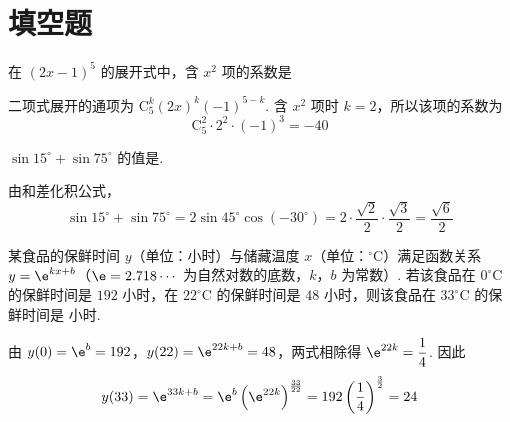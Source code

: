 \section{填空题}

\begin{problem}
在 \((2x - 1)^{5}\) 的展开式中，含 \(x^{2}\) 项的系数是\fillinblank{}


\begin{solution}
二项式展开的通项为 \(\mathrm C_5^k(2x)^k(-1)^{5-k}\). 含 \(x^2\) 项时 \(k=2\)，所以该项的系数为
\[
\mathrm C_5^2\cdot2^2\cdot(-1)^3=-40
\]
\end{solution}
\end{problem}

\begin{problem}
\(\sin 15^{\circ} + \sin 75^{\circ}\) 的值是\fillinblank{}.


\begin{solution}
由和差化积公式，
\[
\sin15^{\circ}+\sin75^{\circ}=2\sin45^{\circ}\cos\left(-30^{\circ}\right)=2\cdot\frac{\sqrt2}{2}\cdot\frac{\sqrt3}{2}=\frac{\sqrt6}{2}
\]
\end{solution}
\end{problem}

\begin{problem}
某食品的保鲜时间 \(y\)（单位：小时）与储藏温度 \(x\)（单位：\(^{\circ}\mathrm{C}\)）满足函数关系 \(y = \e^{kx + b}\)（\(\e = 2.718 \cdots\) 为自然对数的底数，\(k\)，\(b\) 为常数）. 若该食品在 \(0^{\circ}\mathrm{C}\) 的保鲜时间是 \(192\) 小时，在 \(22^{\circ}\mathrm{C}\) 的保鲜时间是 \(48\) 小时，则该食品在 \(33^{\circ}\mathrm{C}\) 的保鲜时间是\fillinblank{} 小时.


\begin{solution}
由 \(y(0)=\e^b=192\)，\(y(22)=\e^{22k+b}=48\)，两式相除得 \(\e^{22k}=\dfrac14\). 因此
\[
y(33)=\e^{33k+b}=\e^b\left(\e^{22k}\right)^{\frac{33}{22}}=192\left(\frac14\right)^{\frac{3}{2}}=24
\]
\end{solution}
\end{problem}

